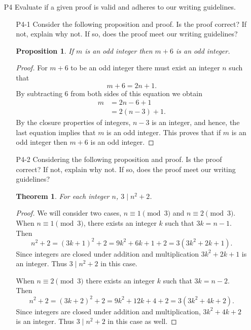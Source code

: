 \documentclass[11pt]{article}
\newtheorem*{proposition}{Proposition}
\newtheorem*{theorem}{Theorem}
\begin{document}
\begin{itemize}
\begin{enumerate}
	
		
	\end{enumerate}
	
\newpage


\item[P4] Evaluate if a given proof is valid and adheres to our writing guidelines.
	\begin{enumerate}
	\item[P4-1] Consider the following proposition and proof. Is the proof correct? If not, explain why not. If so, does the proof meet our writing guidelines? 
	
		\begin{proposition}
		If $m$ is an odd integer then $m+6$ is an odd integer.
		\end{proposition}
		\begin{proof}
		For $m+6$ to be an odd integer there must exist an integer $n$ such that
			\[m+6 = 2n+1.\]
		By subtracting $6$ from both sides of this equation we obtain
			\begin{align*}
			m &= 2n-6+1\\
			&=2(n-3)+1.
			\end{align*}
		By the closure properties of integers, $n-3$ is an integer, and hence, the last equation implies that $m$ is an odd integer. This proves that if $m$ is an odd integer then $m+6$ is an odd integer.
		\end{proof}
		
\item[P4-2] Considering the following proposition and proof. Is the proof correct? If not, explain why not. If so, does the proof meet our writing guidelines?

	\begin{theorem}
	For each integer $n$, $3\mid n^2 + 2$.
	\end{theorem}

	\begin{proof}
	We will consider two cases, $n\equiv 1\pmod{3}$ and $n\equiv 2\pmod{3}$. When $n\equiv 1 \pmod{3}$, there exists an integer $k$ such that $3k = n-1$. Then 
		$$n^2+2 = (3k+1)^2 + 2 = 9k^2 + 6k + 1 + 2 = 3(3k^2+2k+1).$$
	Since integers are closed under addition and multiplication  $3k^2+2k+1$ is an integer. Thus $3\mid n^2+2$ in this case.
	
	When $n\equiv 2 \pmod{3}$ there exists an integer $k$ such that $3k=n-2$. Then
		$$n^2+2 = (3k+2)^2 +2 =9k^2+12k+4+2 = 3(3k^2+4k+2).$$
	Since integers are closed under addition and multiplication, $3k^2+4k+2$ is an integer. Thus $3\mid n^2+2$ in this case as well.
	

\end{proof}
\end{enumerate}
\end{itemize}
\end{document}
